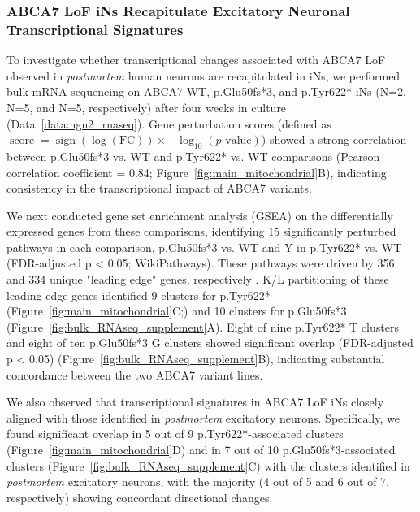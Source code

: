 \subsubsection{ABCA7 LoF iNs Recapitulate Excitatory Neuronal Transcriptional Signatures}
To investigate whether transcriptional changes associated with ABCA7 LoF observed in \emph{postmortem} human neurons are recapitulated in iNs, we performed bulk mRNA sequencing on ABCA7 WT, p.Glu50fs*3, and p.Tyr622* iNs (N=2, N=5, and N=5, respectively) after four weeks in culture (Data~\ref{data:ngn2_rnaseq}). Gene perturbation scores (defined as $\operatorname{score} = \operatorname{sign}(\log(\text{FC})) \times -\log_{10}(p\text{-value})$) showed a strong correlation between p.Glu50fs*3 vs. WT and p.Tyr622* vs. WT comparisons (Pearson correlation coefficient = 0.84; Figure~\ref{fig:main_mitochondrial}B), indicating consistency in the transcriptional impact of ABCA7 variants.

We next conducted gene set enrichment analysis (GSEA) on the differentially expressed genes from these comparisons, identifying 15 significantly perturbed pathways in each comparison, p.Glu50fs*3 vs. WT and Y in p.Tyr622* vs. WT (FDR-adjusted p < 0.05; WikiPathways). 
These pathways were driven by 356 and 334 unique "leading edge" genes, respectively \cite{Subramanian2005-pu}. K/L partitioning of these leading edge genes identified 9 clusters for p.Tyr622* (Figure~\ref{fig:main_mitochondrial}C;) and 10 clusters for p.Glu50fs*3 (Figure~\ref{fig:bulk_RNAseq_supplement}A). Eight of nine p.Tyr622* T clusters and eight of ten p.Glu50fs*3 G clusters showed significant overlap (FDR-adjusted p < 0.05) (Figure~\ref{fig:bulk_RNAseq_supplement}B), indicating substantial concordance between the two ABCA7 variant lines.

We also observed that transcriptional signatures in ABCA7 LoF iNs closely aligned with those identified in \textit{postmortem} excitatory neurons. Specifically, we found significant overlap in 5 out of 9 p.Tyr622*-associated clusters (Figure~\ref{fig:main_mitochondrial}D) and in 7 out of 10 p.Glu50fs*3-associated clusters (Figure~\ref{fig:bulk_RNAseq_supplement}C) with the clusters identified in \textit{postmortem} excitatory neurons, with the majority (4 out of 5 and 6 out of 7, respectively) showing concordant directional changes.

